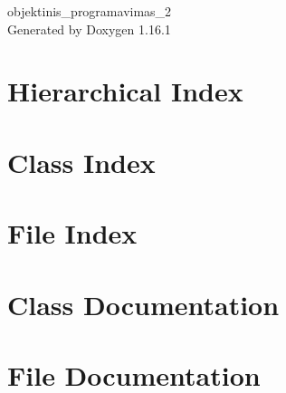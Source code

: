 \documentclass[twoside]{book}
\newcommand{\+}{\discretionary{\mbox{\scriptsize$\hookleftarrow$}}{}{}}
\newcommand{\clearemptydoublepage}{%
    \newpage{\pagestyle{empty}\cleardoublepage}%
  }
\begin{document}
  \raggedbottom
    \hypersetup{pageanchor=false,
                bookmarksnumbered=true,
                pdfencoding=unicode
               }
  \begin{titlepage}
  \vspace*{7cm}
  \begin{center}%
  {\Large objektinis\+\_\+programavimas\+\_\+2}\\
  \vspace*{1cm}
  {\large Generated by Doxygen 1.16.1}\\
  \end{center}
  \end{titlepage}
  \clearemptydoublepage
  \tableofcontents
  \clearemptydoublepage
  \hypersetup{pageanchor=true}
\chapter{Hierarchical Index}

\chapter{Class Index}

\chapter{File Index}

\chapter{Class Documentation}




\chapter{File Documentation}








  \backmatter
  \newpage
  \clearemptydoublepage
  \printindex
\end{document}
